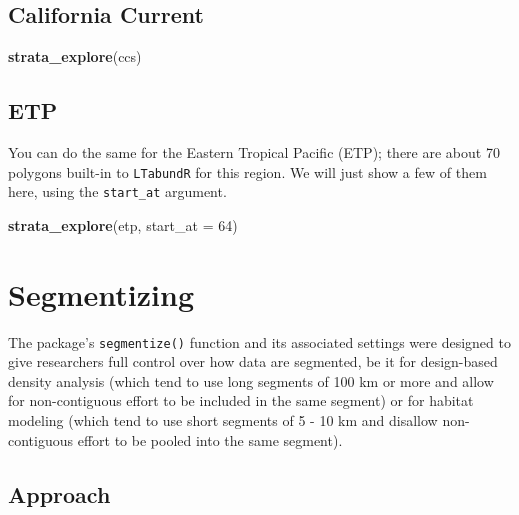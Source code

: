 \documentclass[
]{book}
\newenvironment{Shaded}{\begin{snugshade}}{\end{snugshade}}
\newcommand{\AttributeTok}[1]{\textcolor[rgb]{0.13,0.29,0.53}{#1}}
\newcommand{\DecValTok}[1]{\textcolor[rgb]{0.00,0.00,0.81}{#1}}
\newcommand{\FunctionTok}[1]{\textcolor[rgb]{0.13,0.29,0.53}{\textbf{#1}}}
\newcommand{\NormalTok}[1]{#1}
\newcommand{\StringTok}[1]{\textcolor[rgb]{0.31,0.60,0.02}{#1}}
\begin{document}
\hypertarget{california-current}{%
\section*{California Current}\label{california-current}}

\begin{Shaded}
\begin{Highlighting}[]
\FunctionTok{strata\_explore}\NormalTok{(}\StringTok{\textquotesingle{}ccs\textquotesingle{}}\NormalTok{)}
\end{Highlighting}
\end{Shaded}

\hypertarget{etp}{%
\section*{ETP}\label{etp}}

You can do the same for the Eastern Tropical Pacific (ETP); there are about 70 polygons built-in to \texttt{LTabundR} for this region. We will just show a few of them here, using the \texttt{start\_at} argument.

\begin{Shaded}
\begin{Highlighting}[]
\FunctionTok{strata\_explore}\NormalTok{(}\StringTok{\textquotesingle{}etp\textquotesingle{}}\NormalTok{,}
               \AttributeTok{start\_at =} \DecValTok{64}\NormalTok{)}
\end{Highlighting}
\end{Shaded}

\hypertarget{segmentizing}{%
\chapter{Segmentizing}\label{segmentizing}}

The package's \texttt{segmentize()} function and its associated settings were designed to give researchers full control over how data are segmented, be it for design-based density analysis (which tend to use long segments of 100 km or more and allow for non-contiguous effort to be included in the same segment) or for habitat modeling (which tend to use short segments of 5 - 10 km and disallow non-contiguous effort to be pooled into the same segment).

\hypertarget{approach}{%
\section*{Approach}\label{approach}}
\end{document}
